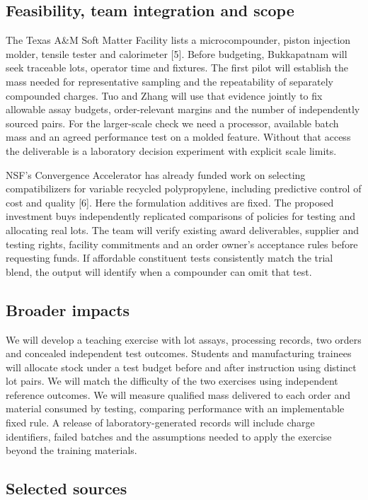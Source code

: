 \documentclass[11pt,letterpaper]{article}
\begin{document}
\subsection*{Feasibility, team integration and scope}

The Texas A\&M Soft Matter Facility lists a microcompounder, piston injection molder, tensile tester and calorimeter [5]. Before budgeting, Bukkapatnam will seek traceable lots, operator time and fixtures. The first pilot will establish the mass needed for representative sampling and the repeatability of separately compounded charges. Tuo and Zhang will use that evidence jointly to fix allowable assay budgets, order-relevant margins and the number of independently sourced pairs. For the larger-scale check we need a processor, available batch mass and an agreed performance test on a molded feature. Without that access the deliverable is a laboratory decision experiment with explicit scale limits.

NSF's Convergence Accelerator has already funded work on selecting compatibilizers for variable recycled polypropylene, including predictive control of cost and quality [6]. Here the formulation additives are fixed. The proposed investment buys independently replicated comparisons of policies for testing and allocating real lots. The team will verify existing award deliverables, supplier and testing rights, facility commitments and an order owner's acceptance rules before requesting funds. If affordable constituent tests consistently match the trial blend, the output will identify when a compounder can omit that test.

\subsection*{Broader impacts}

We will develop a teaching exercise with lot assays, processing records, two orders and concealed independent test outcomes. Students and manufacturing trainees will allocate stock under a test budget before and after instruction using distinct lot pairs. We will match the difficulty of the two exercises using independent reference outcomes. We will measure qualified mass delivered to each order and material consumed by testing, comparing performance with an implementable fixed rule. A release of laboratory-generated records will include charge identifiers, failed batches and the assumptions needed to apply the exercise beyond the training materials.

\subsection*{Selected sources}
\end{document}
